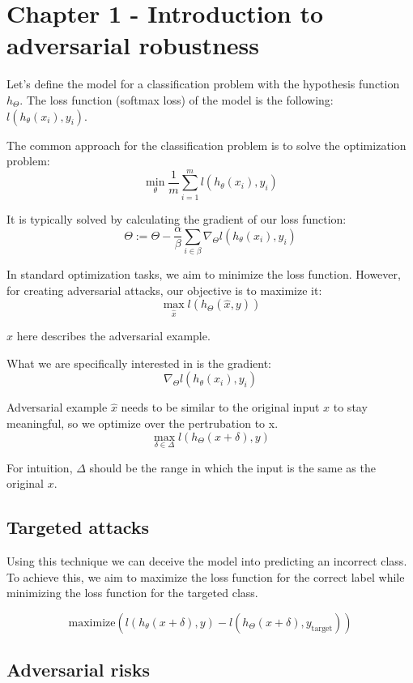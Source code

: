 \section{Chapter 1 - Introduction to adversarial robustness}
Let's define the model for a classification problem with the hypothesis function $h_\Theta$.  The loss function (softmax loss) of the model is the following:
$l(h_{\theta}(x_{i}), y_{i})$.




The common approach for the classification problem is to solve the optimization problem:
\[\min_{\theta} \frac{1}{m} \sum_{i=1}^{m} l(h_{\theta}(x_{i}), y_{i})\]

It is typically solved by calculating the gradient of our loss function:
\[ \Theta := \Theta - \dfrac{\alpha}{\beta} \sum_{i \in \beta} \nabla_\Theta l (h_{\theta}(x_{i}), y_{i}) \]

In standard optimization tasks, we aim to minimize the loss function. However, for creating adversarial attacks, our objective is to maximize it:
\[\max_{\hat{x}} l(h_{\Theta}(\hat{x}, y))\]

$\hat x$ here describes the adversarial example.

What we are specifically interested in is the gradient:
\[  \nabla_\Theta l (h_{\theta}(x_{i}), y_{i}) \]

Adversarial example $\hat{x}$ needs to be similar to the original input $x$ to stay meaningful, so we optimize over the pertrubation to x.
\[\max_{\delta \in \Delta} l (h_{\Theta}(x+\delta), y)\]

For intuition, $\Delta$ should be the range in which the input is the same as the original $x$.


\subsection{Targeted attacks}
Using this technique we can deceive the model into predicting an incorrect class. To achieve this, we aim to maximize the loss function for the correct label while minimizing the loss 
function for the targeted class. 

\[\text{maximize} \left( l(h_{\theta}(x + \delta), y) - l(h_{\Theta}(x + \delta), y_{\text{target}}) \right)
\]


\subsection{Adversarial risks}


